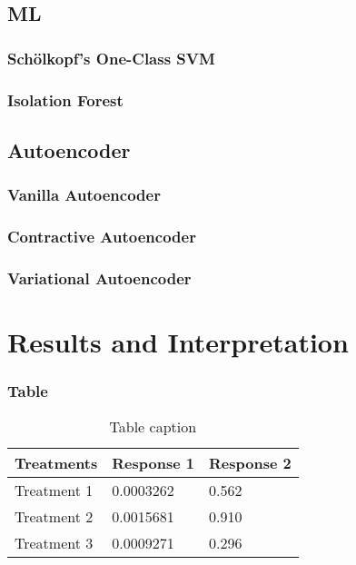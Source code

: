 \documentclass{beamer}
\begin{document}
\subsection{ML} %

\begin{frame}
\frametitle{Sch\"{o}lkopf's One-Class SVM}
\end{frame}

\begin{frame}
\frametitle{Isolation Forest}
\end{frame}

\subsection{Autoencoder}

\begin{frame}
\frametitle{Vanilla Autoencoder}

\end{frame}
\begin{frame}
\frametitle{Contractive Autoencoder}

\end{frame}
\begin{frame}
\frametitle{Variational Autoencoder}

\end{frame}

\section{Results and Interpretation}

\begin{frame}
\frametitle{Table}
\begin{table}
\begin{tabular}{l l l}
\toprule
\textbf{Treatments} & \textbf{Response 1} & \textbf{Response 2}\\
\midrule
Treatment 1 & 0.0003262 & 0.562 \\
Treatment 2 & 0.0015681 & 0.910 \\
Treatment 3 & 0.0009271 & 0.296 \\
\bottomrule
\end{tabular}
\caption{Table caption}
\end{table}
\end{frame}
\end{document}
